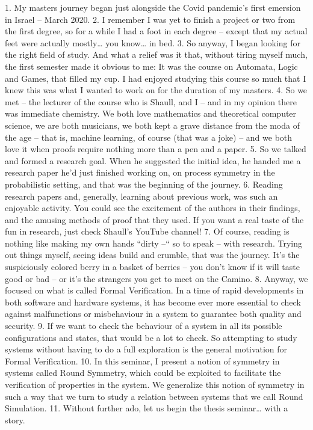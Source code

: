 {1.	My masters journey began just alongside the Covid pandemic’s first emersion in Israel – March 2020.
2.	I remember I was yet to finish a project or two from the first degree, so for a while I had a foot in each degree – except that my actual feet were actually mostly… you know… in bed.
3.	So anyway, I began looking for the right field of study. And what a relief was it that, without tiring myself much, the first semester made it obvious to me: It was the course on Automata, Logic and Games, that filled my cup. I had enjoyed studying this course so much that I knew this was what I wanted to work on for the duration of my masters.
4.	So we met – the lecturer of the course who is Shaull, and I – and in my opinion there was immediate chemistry. We both love mathematics and theoretical computer science, we are both musicians, we both kept a grave distance from the moda of the age – that is, machine learning, of course (that was a joke) – and we both love it when proofs require nothing more than a pen and a paper.
5.	So we talked and formed a research goal. When he suggested the initial idea, he handed me a research paper he’d just finished working on, on process symmetry in the probabilistic setting, and that was the beginning of the journey.
6.	Reading research papers and, generally, learning about previous work, was such an enjoyable activity. You could see the excitement of the authors in their findings, and the amusing methods of proof that they used. If you want a real taste of the fun in research, just check Shaull’s YouTube channel!
7.	Of course, reading is nothing like making my own hands “dirty –“ so to speak – with research. Trying out things myself, seeing ideas build and crumble, that was the journey. It’s the suspiciously colored berry in a basket of berries – you don’t know if it will taste good or bad – or it’s the strangers you get to meet on the Camino.
8.	Anyway, we focused on what is called Formal Verification. In a time of rapid developments in both software and hardware systems, it has become ever more essential to check against malfunctions or misbehaviour in a system to guarantee both quality and security.
9.	If we want to check the behaviour of a system in all its possible configurations and states, that would be a lot to check. So attempting to study systems without having to do a full exploration is the general motivation for Formal Verification.
10.	In this seminar, I present a notion of symmetry in systems called Round Symmetry, which could be exploited to facilitate the verification of properties in the system. We generalize this notion of symmetry in such a way that we turn to study a relation between systems that we call Round Simulation.
11.	Without further ado, let us begin the thesis seminar… with a story.

}

